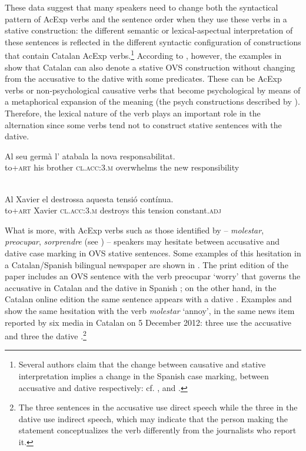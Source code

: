 \documentclass[output=paper,colorlinks,citecolor=brown,nonflat]{./langscibook}
\begin{document}
These data suggest that many speakers need to change both the syntactical pattern of AcExp verbs and the sentence order when they use these verbs in a stative construction: the different semantic or lexical-aspectual interpretation of these sentences is reflected in the different syntactic configuration of constructions that contain Catalan AcExp verbs.\footnote{Several authors claim that the change between causative and stative interpretation implies a change in the Spanish case marking, between accusative and dative respectively: cf. \citet{Fabregas2015experimentante}, \citet{Viñas-de-Puig2017} and \citet{Ganeshan2019}.} According to \citep[29-30]{Ginebra2003}, however, the examples in  show that Catalan can also denote a stative OVS construction without changing from the accusative to the dative with some predicates. These can be AcExp verbs  or non-psychological causative verbs that become psychological by means of a metaphorical expansion of the meaning  (the {psych} {constructions} described by \citealt{Bouchard1995}). Therefore, the lexical nature of the verb plays an important role in the alternation since some verbs tend not to construct stative sentences with the dative.

\ea%
	\citealt[29-30]{Ginebra2003}
 \label{ex:royo:4}
 \ea \label{ex:royo:4a}
 \gll Al seu germà l’ atabala la nova responsabilitat.\\
 to+\textsc{art} his brother \textsc{cl.acc:3.m} overwhelms the new responsibility\\
 \\
 \glt
 
 \ex \label{ex:royo:4b}
 \gll Al Xavier el destrossa aquesta tensió contínua.\\
 to+\textsc{art} Xavier \textsc{cl.acc:3.m} destroys this tension constant.\textsc{adj}
 \\
 \glt
 
 \z
 \z

What is more, with AcExp verbs such as those identified by \citet{CabréMateu1998} – \textit{molestar}, \textit{preocupar}, \textit{sorprendre} (see ) – speakers may hesitate between accusative and dative case marking in OVS stative sentences. Some examples of this hesitation in a Catalan/Spanish bilingual newspaper are shown in . The print edition of the paper includes an OVS sentence with the verb {preocupar} ‘worry’ that governs the accusative in Catalan  and the dative in Spanish ; on the other hand, in the Catalan online edition the same sentence appears with a dative . Examples  and  show the same hesitation with the verb \textit{molestar} ‘annoy’, in the same news item reported by six media in Catalan on 5 December 2012: three use the accusative  and three the dative .\footnote{The three sentences in the accusative use direct speech while the three in the dative use indirect speech, which may indicate that the person making the statement conceptualizes the verb differently from the journalists who report it.}
\end{document}
